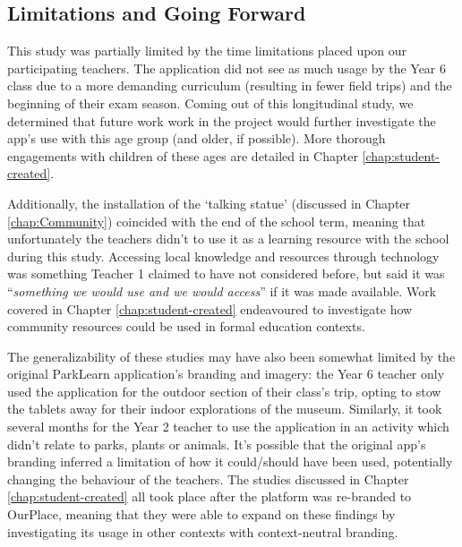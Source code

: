 \subsection{Limitations and Going Forward}

This study was partially limited by the time limitations placed upon our participating teachers. The application did not see as much usage by the Year 6 class due to a more demanding curriculum (resulting in fewer field trips) and the beginning of their exam season. Coming out of this longitudinal study, we determined that future work work in the project would further investigate the app’s use with this age group (and older, if possible). More thorough engagements with children of these ages are detailed in Chapter \ref{chap:student-created}.

Additionally, the installation of the ‘talking statue’ (discussed in Chapter \ref{chap:Community}) coincided with the end of the school term, meaning that unfortunately the teachers didn't to use it as a learning resource with the school during this study. Accessing local knowledge and resources through technology was something Teacher 1 claimed to have not considered before, but said it was “\textit{something we would use and we would access}” if it was made available. Work covered in Chapter \ref{chap:student-created} endeavoured to investigate how community resources could be used in formal education contexts. 

The generalizability of these studies may have also been somewhat limited by the original ParkLearn application's branding and imagery: the Year 6 teacher only used the application for the outdoor section of their class’s trip, opting to stow the tablets away for their indoor explorations of the museum. Similarly, it took several months for the Year 2 teacher to use the application in an activity which didn’t relate to parks, plants or animals. It's possible that the original app's branding inferred a limitation of how it could/should have been used, potentially changing the behaviour of the teachers. The studies discussed in Chapter \ref{chap:student-created} all took place after the platform was re-branded to OurPlace, meaning that they were able to expand on these findings by investigating its usage in other contexts with context-neutral branding.

